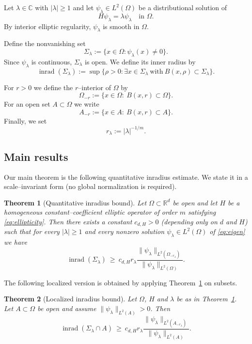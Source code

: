 \documentclass[12pt, reqno]{amsart}
\theoremstyle{plain}
\newtheorem{thm}{Theorem}[section]
\theoremstyle{remark}
\newcommand{\C}{\mathbb{C}}
\newcommand{\R}{\mathbb{R}}
\newcommand{\inrad}{\operatorname{inrad}}
\begin{document}
Let $\lambda\in\C$ with $|\lambda|\ge 1$ and let $\psi_\lambda\in L^2(\Omega)$ be a distributional solution of
\begin{equation}\label{eq:eigen}
H\psi_\lambda = \lambda\psi_\lambda\quad\text{in }\Omega.
\end{equation}
By interior elliptic regularity, $\psi_\lambda$ is smooth in $\Omega$.

Define the nonvanishing set
$$
\Sigma_\lambda := \{x\in\Omega:\psi_\lambda(x)\neq 0\}.
$$
Since $\psi_\lambda$ is continuous, $\Sigma_\lambda$ is open.
We define its inner radius by
$$
\inrad(\Sigma_\lambda) := \sup\{ \rho>0:\exists x\in\Sigma_\lambda\ \text{with}\ B(x,\rho)\subset \Sigma_\lambda \}.
$$

For $r>0$ we define the $r$--interior of $\Omega$ by
$$
\Omega_{-r} := \{x\in\Omega:\ B(x,r)\subset \Omega\}.
$$
For an open set $A\subset\Omega$ we write
$$
A_{-r} := \{x\in A:\ B(x,r)\subset A\}.
$$
Finally, we set
$$
r_\lambda := |\lambda|^{-1/m}.
$$

\subsection{Main results}

Our main theorem is the following quantitative inradius estimate.
We state it in a scale--invariant form (no global normalization is required).

\begin{thm}[Quantitative inradius bound]\label{thm:main}
Let $\Omega\subset\R^d$ be open and let $H$ be a homogeneous constant--coefficient elliptic operator of order $m$ satisfying \eqref{eq:ellipticity}.
Then there exists a constant $c_{d,H}>0$ (depending only on $d$ and $H$) such that for every $|\lambda|\ge 1$ and every nonzero solution $\psi_\lambda\in L^2(\Omega)$ of \eqref{eq:eigen} we have
\begin{equation}\label{eq:main}
\inrad(\Sigma_\lambda)\ \ge\ c_{d,H} r_\lambda 
\frac{\|\psi_\lambda\|_{L^2(\Omega_{-r_\lambda})}}{\|\psi_\lambda\|_{L^2(\Omega)}}.
\end{equation}
\end{thm}

The following localized version is obtained by applying Theorem~\ref{thm:main} on subsets.

\begin{thm}[Localized inradius bound]\label{thm:local}
Let $\Omega$, $H$ and $\lambda$ be as in Theorem~\ref{thm:main}.
Let $A\subset\Omega$ be open and assume $\|\psi_\lambda\|_{L^2(A)}>0$.
Then
\begin{equation}\label{eq:local}
\inrad(\Sigma_\lambda\cap A)\ \ge\ c_{d,H} r_\lambda 
\frac{\|\psi_\lambda\|_{L^2(A_{-r_\lambda})}}{\|\psi_\lambda\|_{L^2(A)}}.
\end{equation}
\end{thm}
\end{document}
